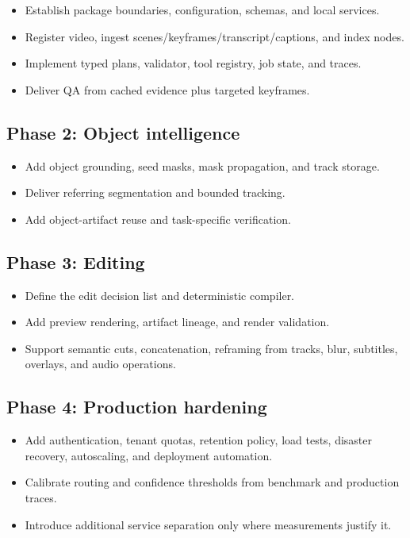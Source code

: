 \documentclass[11pt]{article}
\begin{document}
\begin{itemize}
  \item Establish package boundaries, configuration, schemas, and local services.
  \item Register video, ingest scenes/keyframes/transcript/captions, and index
  nodes.
  \item Implement typed plans, validator, tool registry, job state, and traces.
  \item Deliver QA from cached evidence plus targeted keyframes.
\end{itemize}

\subsection{Phase 2: Object intelligence}

\begin{itemize}
  \item Add object grounding, seed masks, mask propagation, and track storage.
  \item Deliver referring segmentation and bounded tracking.
  \item Add object-artifact reuse and task-specific verification.
\end{itemize}

\subsection{Phase 3: Editing}

\begin{itemize}
  \item Define the edit decision list and deterministic compiler.
  \item Add preview rendering, artifact lineage, and render validation.
  \item Support semantic cuts, concatenation, reframing from tracks, blur,
  subtitles, overlays, and audio operations.
\end{itemize}

\subsection{Phase 4: Production hardening}

\begin{itemize}
  \item Add authentication, tenant quotas, retention policy, load tests, disaster
  recovery, autoscaling, and deployment automation.
  \item Calibrate routing and confidence thresholds from benchmark and production
  traces.
  \item Introduce additional service separation only where measurements justify it.
\end{itemize}
\end{document}
